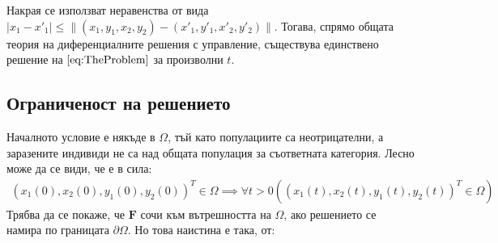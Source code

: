 Накрая се използват неравенства от вида $|x_1-x'_1| \leq \|(x_1, y_1, x_2, y_2) - (x'_1, y'_1, x'_2, y'_2)\|$. Тогава, спрямо общата теория на диференциалните решения с управление, съществува единствено решение на $\eqref{eq:TheProblem}$ за произволни $t$.

\subsection{Ограниченост на решението}
Началното условие е някъде в $\Omega$, тъй като популациите са неотрицателни, а заразените индивиди не са над общата популация за съответната категория. Лесно може да се види, че е в сила:
\begin{align}
  (x_1(0), x_2(0), y_1(0), y_2(0))^T \in \Omega \implies \forall{t>0}\left((x_1(t), x_2(t), y_1(t), y_2(t))^T \in \Omega\right)
\end{align}
Трябва да се покаже, че $\mathbf{F}$ сочи към вътрешността на $\Omega$, ако решението се намира по границата $\partial \Omega$. Но това наистина е така, от:

